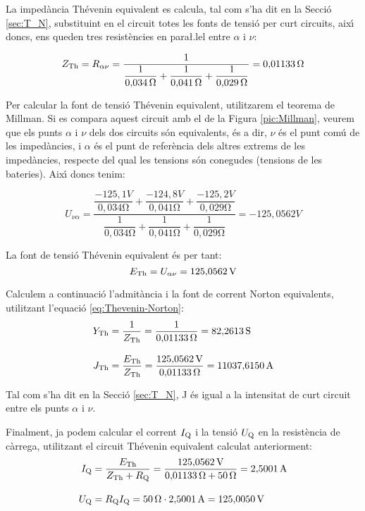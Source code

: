 \begin{exemple}
La imped\`{a}ncia Th\'{e}venin equivalent es calcula, tal com s'ha dit en la Secci\'{o} \ref{sec:T_N},
substituint en el circuit totes les fonts de tensi\'{o} per curt circuits, aix\'{\i} doncs, ens
queden tres resist\`{e}ncies en para{\l.l}el entre $\alpha$ i $\nu$:

\[
Z_\mathrm{Th} = R_{\alpha\nu} =\frac{1}{\dfrac{1}{0{,}034\mathrm{\,\mathrm{\Omega}}} +
\dfrac{1}{0{,}041\mathrm{\,\mathrm{\Omega}}} + \dfrac{1}{0{,}029\mathrm{\,\mathrm{\Omega}}}} =
0{,}01133\mathrm{\,\mathrm{\Omega}}
\]

Per calcular la font de tensi\'{o} Th\'{e}venin equivalent, utilitzarem el teorema de Millman. Si
es compara aquest circuit amb el de la Figura \vref{pic:Millman}, veurem que els punts $\alpha$
i $\nu$ dels dos circuits s\'{o}n equivalents, \'{e}s a dir, $\nu$ \'{e}s el punt com\'{u} de les imped\`{a}ncies, i $\alpha$ \'{e}s
el punt de refer\`{e}ncia dels altres extrems de les imped\`{a}ncies, respecte del qual les
tensions s\'{o}n conegudes (tensions de les bateries). Aix\'{\i} doncs tenim:

\[
U_{\nu\alpha} = \frac{\dfrac{-125{,}1\unit{V}}{0{,}034\unit{\ohm}} +
\dfrac{-124{,}8\unit{V}}{0{,}041\unit{\ohm}} +
\dfrac{-125{,}2\unit{V}}{0{,}029\unit{\ohm}}}{\dfrac{1}{0{,}034\unit{\ohm}}
+ \dfrac{1}{0{,}041\unit{\ohm}} + \dfrac{1}{0{,}029\unit{\ohm}}} =
-125{,}0562\unit{V}
\]

La font de tensi\'{o}  Th\'{e}venin equivalent \'{e}s per tant:
\[
E_\mathrm{Th} = U_{\alpha\nu} = 125{,}0562\mathrm{\,V}
\]

Calculem a continuaci\'{o} l'admit\`{a}ncia i la font de corrent  Norton equivalents, utilitzant
l'equaci\'{o} \eqref{eq:Thevenin-Norton}:
\begin{align*}
    Y_\mathrm{Th} &= \frac{1}{Z_\mathrm{Th}} = \frac{1}{0{,}01133\mathrm{\,\mathrm{\Omega}}} = 82{,}2613\mathrm{\,S}
    \\[2ex]
    J_\mathrm{Th} &= \frac{E_\mathrm{Th}}{Z_\mathrm{Th}} =
    \frac{125{,}0562\mathrm{\,V}}{0{,}01133\mathrm{\,\mathrm{\Omega}}}= 11037{,}6150\mathrm{\,A}
\end{align*}

Tal com s'ha dit en la Secci\'{o} \ref{sec:T_N}, J \'{e}s igual a la intensitat de curt
circuit entre els punts $\alpha$ i $\nu$.

Finalment, ja podem calcular el corrent $I_\mathrm{Q}$ i la tensi\'{o} $U_\mathrm{Q}$ en la
resist\`{e}ncia de c\`{a}rrega, utilitzant el circuit Th\'{e}venin equivalent calculat anteriorment:
\begin{align*}
    I_\mathrm{Q} &= \frac{E_\mathrm{Th}}{Z_\mathrm{Th} + R_\mathrm{Q}} = \frac{125{,}0562\mathrm{\,V}}
    {0{,}01133\mathrm{\,\mathrm{\Omega}} + 50\mathrm{\,\mathrm{\Omega}}} = 2{,}5001\mathrm{\,A} \\[2ex]
    U_\mathrm{Q} &=  R_\mathrm{Q} I_\mathrm{Q} = 50\mathrm{\,\mathrm{\Omega}} \cdot 2{,}5001\mathrm{\,A} =
    125{,}0050\mathrm{\,V}
\end{align*}

\end{exemple}


